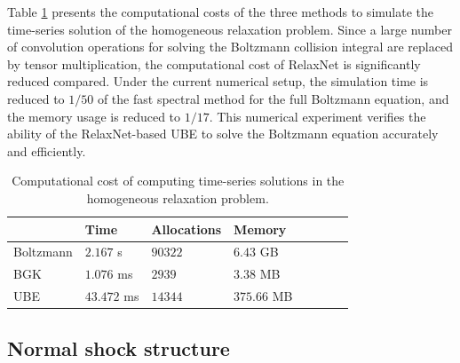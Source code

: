 \documentclass[preprint,3p,12pt,sort&compress]{elsarticle}
\begin{document}
Table \ref{tab:cost relaxation} presents the computational costs of the three methods to simulate the time-series solution of the homogeneous relaxation problem.
Since a large number of convolution operations for solving the Boltzmann collision integral are replaced by tensor multiplication, the computational cost of RelaxNet is significantly reduced compared.
Under the current numerical setup, the simulation time is reduced to $1/50$ of the fast spectral method for the full Boltzmann equation, and the memory usage is reduced to $1/17$.
This numerical experiment verifies the ability of the RelaxNet-based UBE to solve the Boltzmann equation accurately and efficiently.

\begin{table}[htbp]
	\caption{Computational cost of computing time-series solutions in the homogeneous relaxation problem.} 
	\centering
	\begin{tabular}{llllllll} 
		\hline
		 & Time & Allocations & Memory & \\
		\hline
		Boltzmann & $2.167$ s & $90322$ & $6.43$ GB & \\
		BGK & $1.076$ ms & $2939$ & $3.38$ MB & \\ 
		UBE & $43.472$ ms & $14344$ & $375.66$ MB & \\
		\hline
	\end{tabular} 
	\label{tab:cost relaxation}
\end{table}

\subsection{Normal shock structure}
\end{document}
